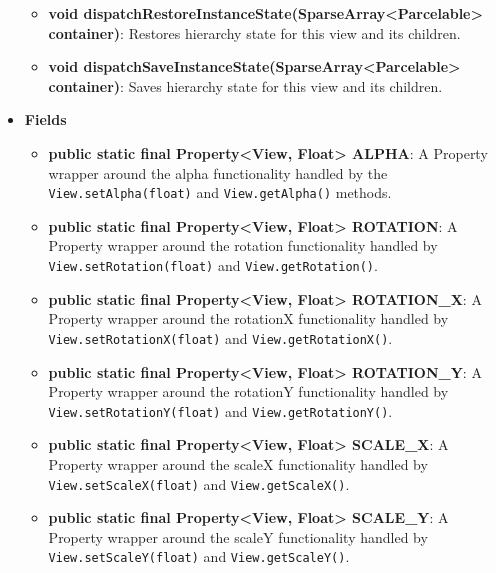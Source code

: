 \documentclass{report}
\begin{document}
\begin{itemize}
\begin{itemize}
                \item \textbf{void dispatchRestoreInstanceState(SparseArray<Parcelable> container)}:  
                    Restores hierarchy state for this view and its children.

                \item \textbf{void dispatchSaveInstanceState(SparseArray<Parcelable> container)}:  
                    Saves hierarchy state for this view and its children.
            \end{itemize}

        \item \textbf{Fields}
            \begin{itemize}
                \item \textbf{public static final Property<View, Float> ALPHA}:  
                    A Property wrapper around the alpha functionality handled by the \texttt{View.setAlpha(float)} and \texttt{View.getAlpha()} methods.

                \item \textbf{public static final Property<View, Float> ROTATION}:  
                    A Property wrapper around the rotation functionality handled by \texttt{View.setRotation(float)} and \texttt{View.getRotation()}.

                \item \textbf{public static final Property<View, Float> ROTATION\_X}:  
                    A Property wrapper around the rotationX functionality handled by \texttt{View.setRotationX(float)} and \texttt{View.getRotationX()}.

                \item \textbf{public static final Property<View, Float> ROTATION\_Y}:  
                    A Property wrapper around the rotationY functionality handled by \texttt{View.setRotationY(float)} and \texttt{View.getRotationY()}.

                \item \textbf{public static final Property<View, Float> SCALE\_X}:  
                    A Property wrapper around the scaleX functionality handled by \texttt{View.setScaleX(float)} and \texttt{View.getScaleX()}.

                \item \textbf{public static final Property<View, Float> SCALE\_Y}:  
                    A Property wrapper around the scaleY functionality handled by \texttt{View.setScaleY(float)} and \texttt{View.getScaleY()}.


\end{itemize}
\end{itemize}
\end{document}
